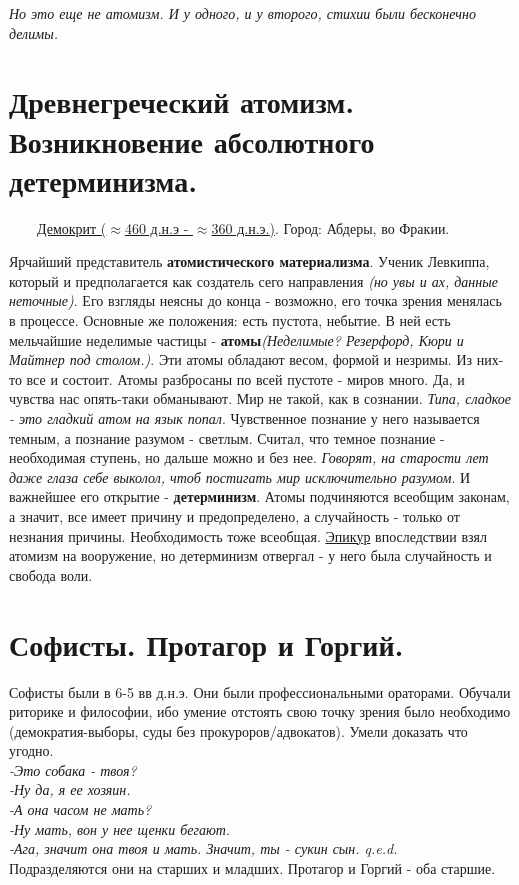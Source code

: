 \documentclass[12pt,a4paper]{article}
\begin{document}
\textit{Но это еще не атомизм. И у одного, и у второго, стихии были бесконечно делимы.} 

\section{Древнегреческий атомизм. Возникновение абсолютного детерминизма.}
\ \ \ \
\underline{Демокрит ($\approx$460 д.н.э - $\approx$360 д.н.э.)}. Город: Абдеры, во Фракии.

Ярчайший представитель \textbf{атомистического материализма}.
Ученик Левкиппа, который и предполагается как создатель сего направления \textit{(но увы и ах, данные неточные)}.
Его взгляды неясны до конца - возможно, его точка зрения менялась в процессе. Основные же положения:
есть пустота, небытие. В ней есть мельчайшие неделимые частицы - \textbf{атомы}\textit{(Неделимые? Резерфорд, Кюри и Майтнер под столом.)}. Эти атомы обладают весом, формой и незримы. Из них-то все и состоит. Атомы разбросаны по всей пустоте - миров много. Да, и чувства нас опять-таки обманывают. Мир не такой, как в сознании. \textit{Типа, сладкое - это гладкий атом на язык попал}. Чувственное познание у него называется темным, а познание разумом - светлым. Считал, что темное познание - необходимая ступень, но дальше можно и без нее. \textit{Говорят, на старости лет даже глаза себе выколол, чтоб постигать мир исключительно разумом}. И важнейшее его открытие - \textbf{детерминизм}. Атомы подчиняются всеобщим законам, а значит, все имеет причину и предопределено, а случайность - только от незнания причины. Необходимость тоже всеобщая. \underline{Эпикур} впоследствии взял атомизм на вооружение, но детерминизм отвергал - у него была случайность и свобода воли.

\section{Софисты. Протагор и Горгий.}
Софисты были в 6-5 вв д.н.э. Они были профессиональными ораторами. Обучали риторике и философии, ибо умение отстоять свою точку зрения было необходимо (демократия-выборы, суды без прокуроров/адвокатов). Умели доказать что угодно.
\textit{\\-Это собака - твоя?\\ -Ну да, я ее хозяин.\\-А она часом не мать?\\-Ну мать, вон у нее щенки бегают.\\-Ага, значит она твоя и мать. Значит, ты - сукин сын. q.e.d.\\}
Подразделяются они на старших и младших. Протагор и Горгий - оба старшие.
\end{document}
